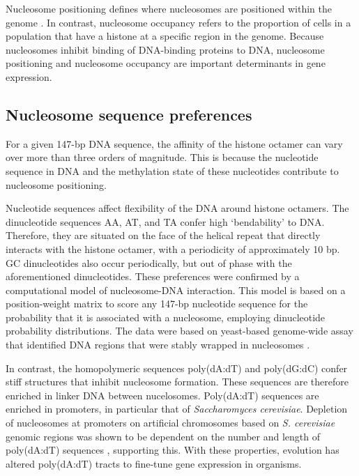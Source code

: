 \documentclass[parskip=full, numbers=noenddot]{scrreprt}
\begin{document}

Nucleosome positioning defines where nucleosomes are positioned within the genome \citep{struhl_determinants_2013}.
In contrast, nucleosome occupancy refers to the proportion of cells in a population that have a histone at a specific region in the genome. %
Because nucleosomes inhibit binding of DNA-binding proteins to DNA, nucleosome positioning and nucleosome occupancy are important determinants in gene expression. %

\subsection{Nucleosome sequence preferences}
\label{ssec:emsaselex_intro_seqpref}

For a given 147-bp DNA sequence, the affinity of the histone octamer can vary over more than three orders of magnitude.
This is because the nucleotide sequence in DNA and the methylation state of these nucleotides contribute to nucleosome positioning.

Nucleotide sequences affect flexibility of the DNA around histone octamers.  The dinucleotide sequences AA, AT, and TA confer high `bendability' to DNA.  Therefore, they are situated on the face of the helical repeat that directly interacts with the histone octamer, with a periodicity of approximately 10 bp.  GC dinucleotides also occur periodically, but out of phase with the aforementioned dinucleotides.  These preferences were confirmed by a computational model of nucleosome-DNA interaction.  This model is based on a position-weight matrix to score any 147-bp nucleotide sequence for the probability that it is associated with a nucleosome, employing dinucleotide probability distributions.  The data were based on yeast-based genome-wide assay that identified DNA regions that were stably wrapped in nucleosomes \citep{segal_genomic_2006}.

In contrast, the homopolymeric sequences poly(dA:dT) and poly(dG:dC) confer stiff structures that inhibit nucleosome formation.  These sequences are therefore enriched in linker DNA between nucelosomes.  Poly(dA:dT) sequences are enriched in promoters, in particular that of \emph{Saccharomyces cerevisiae}.  Depletion of nucleosomes at promoters on artificial chromosomes based on \emph{S. cerevisiae} genomic regions was shown to be dependent on the number and length of poly(dA:dT) sequences \citep{hughes_functional_2012}, supporting this.
With these properties, evolution has altered poly(dA:dT) tracts to fine-tune gene expression in organisms. %
\end{document}
